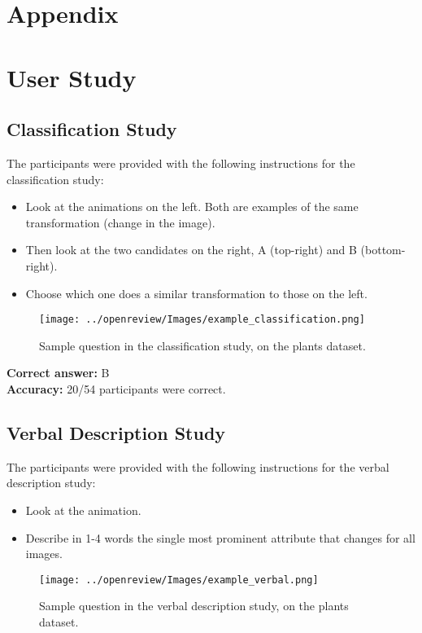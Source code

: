 \newpage
\section*{Appendix}
\section{User Study}\label{appendix:user-study}

\subsection{Classification Study}
The participants were provided with the following instructions for the classification study:

\begin{itemize}
    \item Look at the animations on the left. Both are examples of the same transformation (change in the image).
    \item Then look at the two candidates on the right, A (top-right) and B (bottom-right).
    \item Choose which one does a similar transformation to those on the left.
\end{itemize}

\begin{figure}[h!]
    \centering
    \texttt{[image: ../openreview/Images/example\_classification.png]}
    \caption{Sample question in the classification study, on the plants dataset.}
    \label{fig:sample-plants-classification}
\end{figure}

\textbf{Correct answer:} B \\
\textbf{Accuracy:} 20/54 participants were correct.

\subsection{Verbal Description Study}
The participants were provided with the following instructions for the verbal description study:

\begin{itemize}
    \item Look at the animation. 
    \item Describe in 1-4 words the single most prominent attribute that changes for all images.
\end{itemize}

\begin{figure}[h!]
    \centering
    \texttt{[image: ../openreview/Images/example\_verbal.png]}
    \caption{Sample question in the verbal description study, on the plants dataset.}
    \label{fig:sample-plants-verbal}
\end{figure}


